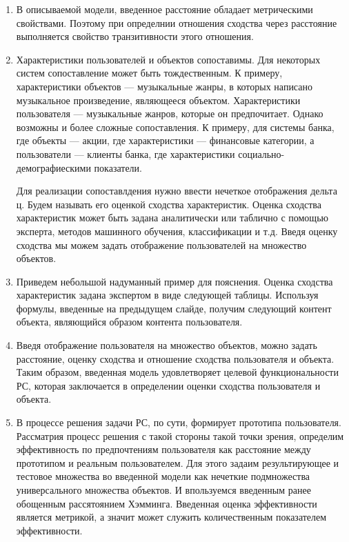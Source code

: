 \documentclass[a4paper,14pt]{proc}
\begin{document}
{\begin{enumerate}
\item В описываемой модели, введенное расстояние обладает метрическими свойствами. Поэтому при определнии отношения сходства
через расстояние выполняется свойство транзитивности этого отношения. 

\item Характеристики пользователей и объектов сопоставимы. Для некоторых систем сопоставление может быть тождественным. К примеру, характеристики объектов ---  
музыкальные жанры, в которых написано музыкальное произведение, являющееся объектом. Характеристики пользователя --- музыкальные жанров, которые он предпочитает. Однако 
возможны и более сложные сопоставления. К примеру, для системы банка, где объекты --- акции, где характеристики --- финансовые категории, а пользователи ---
клиенты банка, где характеристики  социально-демографиескими показатели.

Для реализации сопоставлдения нужно ввести нечеткое отображения дельта ц. Будем называть его
оценкой сходства характеристик. Оценка сходства характеристик может быть задана аналитически или таблично с помощью эксперта, 
методов машинного обучения, классификации и т.д. Введя оценку сходства мы можем задать отображение пользователей на множество объектов.

\item Приведем небольшой надуманный пример для пояснения. Оценка сходства характеристик задана экспертом в виде следующей таблицы.
Используя формулы, введенные на предыдущем слайде, получим следующий контент объекта, являющийся образом контента пользователя.

\item Введя отображение пользователя на множество объектов, можно задать расстояние, оценку сходства и
отношение сходства пользователя и объекта. Таким образом, введенная модель удовлетворяет целевой функциональности РС, которая 
заключается в определении оценки сходства пользователя и объекта.  

\item В процессе решения задачи РС, по сути, формирует прототипа пользователя. Рассматрия процесс решения с такой стороны такой точки зрения, 
определим эффективность по предпочтениям пользователя как расстояние между прототипом и реальным пользователем.
Для этого задаим результирующее и тестовое множества во введенной модели как нечеткие подмножества универсального множества объектов.
И впользуемся введенным ранее обощенным рассятоянием Хэмминга. Введенная оценка эффективности является метрикой, а значит может служить
количественным показателем эффективности.


\end{enumerate}}
\end{document}

